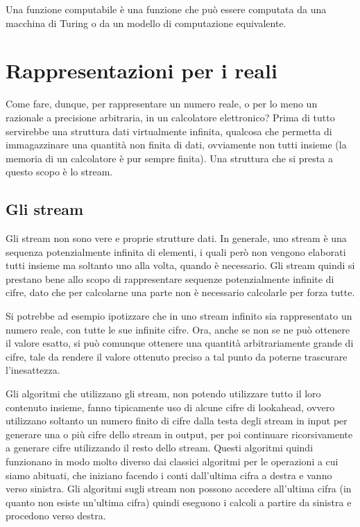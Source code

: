 \documentclass[Lau]{sapthesis}
\begin{document}
Una funzione computabile è una funzione che può essere computata da una macchina di Turing o da un modello di computazione equivalente.


\section{Rappresentazioni per i reali}
Come fare, dunque, per rappresentare un numero reale, o per lo meno un razionale 
a precisione arbitraria, in un calcolatore elettronico? Prima di tutto 
servirebbe una struttura dati virtualmente infinita, qualcosa che permetta di 
immagazzinare una quantità non finita di dati, ovviamente non tutti insieme (la 
memoria di un calcolatore è pur sempre finita). Una struttura che si presta a 
questo scopo è lo stream.


\subsection{Gli stream}
Gli stream non sono vere e proprie strutture dati. In generale, uno stream è una 
sequenza potenzialmente infinita di elementi, i quali però non vengono elaborati tutti insieme ma 
soltanto uno alla volta, quando è necessario. Gli stream quindi si prestano bene 
allo scopo di rappresentare sequenze potenzialmente infinite di cifre, dato che 
per calcolarne una parte non è necessario calcolarle per forza tutte.

Si potrebbe ad esempio ipotizzare che in uno stream infinito sia rappresentato 
un numero reale, con tutte le sue infinite cifre. Ora, anche se non se ne può 
ottenere il valore esatto, si può comunque ottenere una quantità arbitrariamente 
grande di cifre, tale da rendere il valore ottenuto preciso a tal punto da 
poterne trascurare l'inesattezza.

Gli algoritmi che utilizzano gli stream, non potendo utilizzare tutto il loro 
contenuto insieme, fanno tipicamente uso di alcune cifre di lookahead, ovvero 
utilizzano soltanto un numero finito di cifre dalla testa degli stream in input 
per generare una o più cifre dello stream in output, per poi continuare 
ricorsivamente a generare cifre utilizzando il resto dello stream. Questi 
algoritmi quindi funzionano in modo molto diverso dai classici algoritmi per le 
operazioni a cui siamo abituati, che iniziano facendo i conti dall'ultima cifra 
a destra e vanno verso sinistra. Gli algoritmi sugli stream non possono accedere 
all'ultima cifra (in quanto non esiste un'ultima cifra) quindi eseguono i 
calcoli a partire da sinistra e procedono verso destra.
\end{document}
